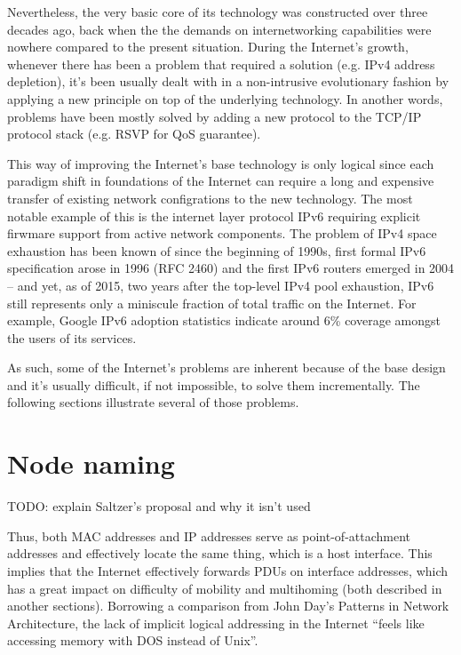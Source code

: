     Nevertheless, the very basic core of its technology was constructed over three decades ago, back when the the demands on internetworking capabilities were nowhere compared to the present situation. During the Internet's growth, whenever there has been a problem that required a solution (e.g. IPv4 address depletion), it's been usually dealt with in a non-intrusive evolutionary fashion by applying a new principle on top of the underlying technology. In another words, problems have been mostly solved by adding a new protocol to the TCP/IP protocol stack (e.g. RSVP for QoS guarantee).

    This way of improving the Internet's base technology is only logical since each paradigm shift in foundations of the Internet can require a long and expensive transfer of existing network configrations to the new technology. The most notable example of this is the internet layer protocol IPv6 requiring explicit firwmare support from active network components. The problem of IPv4 space exhaustion has been known of since the beginning of 1990s, first formal IPv6 specification arose in 1996 (RFC 2460) and the first IPv6 routers emerged in 2004 -- and yet, as of 2015, two years after the top-level IPv4 pool exhaustion, IPv6 still represents only a miniscule fraction of total traffic on the Internet. For example, Google IPv6 adoption statistics indicate around 6\% coverage amongst the users of its services.

    As such, some of the Internet's problems are inherent because of the base design and it's usually difficult, if not impossible, to solve them incrementally. The following sections illustrate several of those problems.

    \section{Node naming}

        TODO: explain Saltzer's proposal and why it isn't used

        Thus, both MAC addresses and IP addresses serve as point-of-attachment addresses and effectively locate the same thing, which is a host interface. This implies that the Internet effectively forwards PDUs on interface addresses, which has a great impact on difficulty of mobility and multihoming (both described in another sections). Borrowing a comparison from John Day's Patterns in Network Architecture, the lack of implicit logical addressing in the Internet ``feels like accessing memory with DOS instead of Unix''.

